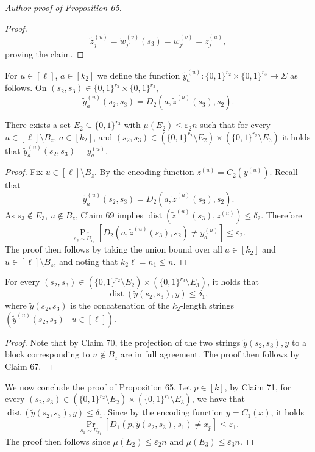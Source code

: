 \begin{proof}[Author proof of Proposition 65]
\begin{proof}
\[\widetilde z_j^{(u)}=\widetilde w_{j'}^{(v)}(s_3)=w_{j'}^{(v)}=z_j^{(u)},\]
proving the claim.
\end{proof}
For $u\in[\ell]$, $a\in[k_2]$ we define the function $\widetilde y_a^{(u)}:\{0,1\}^{r_2}\times\{0,1\}^{r_3}\to\Sigma$ as follows. On $(s_2,s_3)\in\{0,1\}^{r_2}\times\{0,1\}^{r_3}$,
\[\widetilde y_a^{(u)}(s_2,s_3)=D_2(a,\widetilde z^{(u)}(s_3),s_2).\]
\begin{ntclaim}
There exists a set $E_2\subseteq\{0,1\}^{r_2}$ with $\mu(E_2)\leq\varepsilon_2n$ such that for every $u\in[\ell]\setminus B_z$, $a\in[k_2]$, and $(s_2,s_3)\in(\{0,1\}^{r_2}\setminus E_2)\times(\{0,1\}^{r_3}\setminus E_3)$ it holds that $\widetilde y_a^{(u)}(s_2,s_3)=y_a^{(u)}$.
\end{ntclaim}
\begin{proof}
Fix $u\in[\ell]\setminus B_z$. By the encoding function $z^{(u)}=C_2(y^{(u)})$. Recall that
\[\widetilde y_a^{(u)}(s_2,s_3)=D_2(a,\widetilde z^{(u)}(s_3),s_2).\]
As $s_3\notin E_3$, $u\notin B_z$, Claim 69 implies $\operatorname{dist}(\widetilde z^{(u)}(s_3),z^{(u)})\leq\delta_2$. Therefore
\[\Pr_{s_2\sim U_{r_2}}[D_2(a,\widetilde z^{(u)}(s_3),s_2)\ne y_a^{(u)}]\leq\varepsilon_2.\]
The proof then follows by taking the union bound over all $a\in[k_2]$ and $u\in[\ell]\setminus B_z$, and noting that $k_2\ell=n_1\leq n$.
\end{proof}
\begin{ntclaim}
For every $(s_2,s_3)\in(\{0,1\}^{r_2}\setminus E_2)\times(\{0,1\}^{r_3}\setminus E_3)$, it holds that
\[\operatorname{dist}(\widetilde y(s_2,s_3),y)\leq\delta_1,\]
where $\widetilde y(s_2,s_3)$ is the concatenation of the $k_2$-length strings $(\widetilde y^{(u)}(s_2,s_3)\mid u\in[\ell])$.
\end{ntclaim}
\begin{proof}
Note that by Claim 70, the projection of the two strings $\widetilde y(s_2,s_3),y$ to a block corresponding to $u\notin B_z$ are in full agreement. The proof then follows by Claim 67.
\end{proof}
We now conclude the proof of Proposition 65. Let $p\in[k]$, by Claim 71, for every $(s_2,s_3)\in(\{0,1\}^{r_2}\setminus E_2)\times(\{0,1\}^{r_3}\setminus E_3)$, we have that $\operatorname{dist}(\widetilde y(s_2,s_3),y)\leq\delta_1$. Since by the encoding function $y=C_1(x)$, it holds
\[\Pr_{s_1\sim U_{r_1}}[D_1(p,\widetilde y(s_2,s_3),s_1)\ne x_p]\leq\varepsilon_1.\]
The proof then follows since $\mu(E_2)\leq\varepsilon_2n$ and $\mu(E_3)\leq\varepsilon_3n$.
\end{proof}
